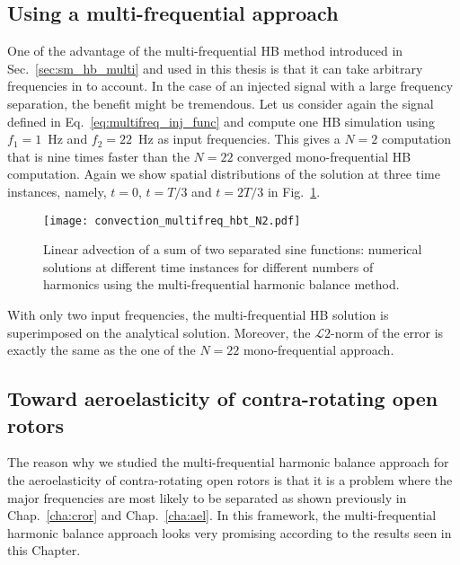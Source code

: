 \subsection{Using a multi-frequential approach}

One of the advantage of the multi-frequential HB method introduced in Sec.~\ref{sec:sm_hb_multi}
and used in this thesis is that it can take arbitrary frequencies in to account.
In the case of an injected signal with a large frequency separation, the
benefit might be tremendous. Let us consider again the signal defined in 
Eq.~\eqref{eq:multifreq_inj_func} and compute one HB simulation using 
$f_1=1$~Hz and $f_2=22$~Hz as input frequencies. This gives a $N=2$
computation that is nine times faster than the $N=22$ converged mono-frequential
HB computation.
Again
we show spatial distributions of the solution
at three time instances, namely, $t=0$, $t=T/3$ and $t=2T/3$
in Fig.~\ref{fig:inj_multifreq_hb}.
\begin{figure}[htb]
  \centering
  \texttt{[image: convection\_multifreq\_hbt\_N2.pdf]}
  \caption{Linear advection of a sum of two separated sine functions: 
  numerical solutions at different time instances for different numbers of harmonics using the
  multi-frequential harmonic balance method.}
  \label{fig:inj_multifreq_hb}
\end{figure}
With only two input frequencies, the multi-frequential
HB solution is superimposed on the analytical solution.
Moreover, the $\mathcal{L}2$-norm of the error is 
exactly the same as the one of the $N=22$ mono-frequential
approach.


\subsection{Toward aeroelasticity of contra-rotating open rotors}
The reason why we studied the multi-frequential harmonic balance
approach for the aeroelasticity of contra-rotating open rotors
is that it is a problem where the major frequencies are most
likely to be separated as shown previously in Chap.~\ref{cha:cror} and
Chap.~\ref{cha:ael}. In this framework, the multi-frequential
harmonic balance approach looks very promising according to the results
seen in this Chapter.
